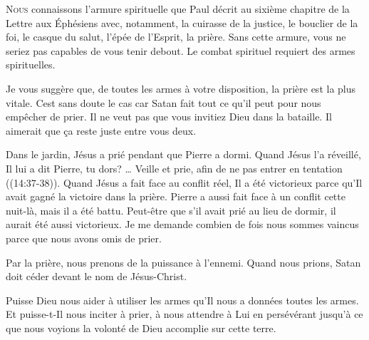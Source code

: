 

\lettrine{N}{ous} connaissons l'armure spirituelle que Paul décrit
 au sixième chapitre de la Lettre aux Éphésiens avec, notamment,
 la cuirasse de la justice, le bouclier de la foi, le casque du salut,
 l'épée de l'Esprit, la prière. Sans cette armure,
 vous ne seriez pas capables de vous tenir debout.
 Le combat spirituel requiert des armes spirituelles.

Je vous suggère que, de toutes les armes à votre disposition,
 la prière est la plus vitale. Cest sans doute le cas car Satan
 fait tout ce qu'il peut pour nous empêcher de prier.
 Il ne veut pas que vous invitiez Dieu dans la bataille.
 Il aimerait que \c{c}a reste juste entre vous deux.


Dans le jardin, Jésus a prié pendant que Pierre a dormi.
 Quand Jésus l'a réveillé, Il lui a dit\frcolon{} 
 \Og Pierre, tu dors? \dots{} Veille et prie, afin de ne pas entrer
 en tentation \Fg{} ((14:37-38)).
 Quand Jésus a fait face au conflit réel, Il a été victorieux
 parce qu'Il avait gagné la victoire dans la prière.
 Pierre a aussi fait face à un conflit cette nuit-là, mais il a été battu.
 Peut-être que s'il avait prié au lieu de dormir,
 il aurait été aussi victorieux. Je me demande combien de fois
 nous sommes vaincus parce que nous avons omis de prier.

Par la prière, nous prenons de la puissance à l'ennemi.
 Quand nous prions, Satan doit céder devant le nom de Jésus-Christ.

Puisse Dieu nous aider à utiliser les armes qu'Il nous a données
 \ocadr toutes les armes. Et puisse-t-Il nous inciter à prier,
 à nous attendre à Lui en persévérant jusqu'à ce que nous voyions
 la volonté de Dieu accomplie sur cette terre.

\dvrule




